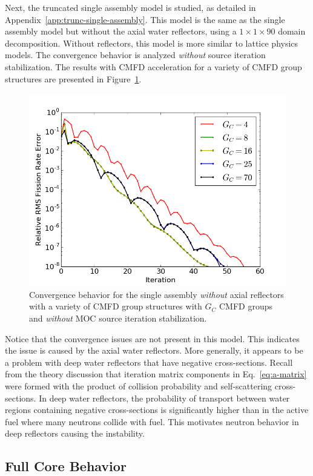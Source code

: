 Next, the truncated single assembly model is studied, as detailed in Appendix~\ref{app:trunc-single-assembly}. This model is the same as the single assembly model but without the axial water reflectors, using a $1\times 1\times 90$ domain decomposition. Without reflectors, this model is more similar to lattice physics models. The convergence behavior is analyzed \textit{without} source iteration stabilization. The results with \ac{CMFD} acceleration for a variety of \ac{CMFD} group structures are presented in Figure~\ref{fig:truncated-convergence}.
\begin{figure}[ht!]
	\centering
	\includegraphics[width=0.65\linewidth]{figures/convergence/sa_trunc_no_stab.png}
	\caption{Convergence behavior for the single assembly \textit{without} axial reflectors with a variety of \ac{CMFD} group structures with $G_C$ \ac{CMFD} groups and \textit{without} \ac{MOC} source iteration stabilization.}
	\label{fig:truncated-convergence}
\end{figure}
Notice that the convergence issues are not present in this model. This indicates the issue is caused by the axial water reflectors. More generally, it appears to be a problem with deep water reflectors that have negative cross-sections. Recall from the theory discussion that iteration matrix components in Eq.~\ref{eq:a-matrix} were formed with the product of collision probability and self-scattering cross-sections. In deep water reflectors, the probability of transport between water regions containing negative cross-sections is significantly higher than in the active fuel where many neutrons collide with fuel. This motivates neutron behavior in deep reflectors causing the instability. 

\subsection{Full Core Behavior}

